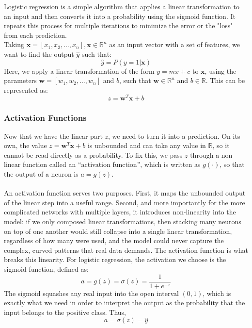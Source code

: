 \documentclass{article}
\begin{document}
Logistic regression is a simple algorithm that applies a linear transformation to an input and then converts it into a probability using the sigmoid function. It repeats this process for multiple iterations to minimize the error or the "loss" from each prediction.
\\
Taking $\mathbf{x} = [x_1, x_2, \dots, x_n], \mathbf{x} \in \mathbb{R}^n$ as an input vector with a set of features, we want to find the output $\hat{y}$ such that:
$$\hat{y} = P(y=1|\mathbf{x})$$
Here, we apply a linear transformation of the form $y=mx+c$ to $\mathbf{x}$, using the parameters $\mathbf{w}=[w_1, w_2, \dots, w_n]$ and $b$, such that $\mathbf{w} \in \mathbb{R}^n$ and $b \in \mathbb{R}$. This can be represented as:
\begin{equation}
    z = \mathbf{w}^T\mathbf{x}+b
\end{equation}
\subsubsection{Activation Functions}
Now that we have the linear part $z$, we need to turn it into a prediction. On its own, the value $z = \mathbf{w}^T\mathbf{x} + b$ is unbounded and can take any value in $\mathbb{R}$, so it cannot be read directly as a probability. To fix this, we pass $z$ through a non-linear function called an ``activation function'', which is written as $g(\cdot)$, so that the output of a neuron is $a = g(z)$.
\\
\\
An activation function serves two purposes. First, it maps the unbounded output of the linear step into a useful range. Second, and more importantly for the more complicated networks with multiple layers, it introduces non-linearity into the model: if we only composed linear transformations, then stacking many neurons on top of one another would still collapse into a single linear transformation, regardless of how many were used, and the model could never capture the complex, curved patterns that real data demands. The activation function is what breaks this linearity.
For logistic regression, the activation we choose is the sigmoid function, defined as:
\begin{equation}
    a = g(z) = \sigma(z) = \frac{1}{1 + e^{-z}}
\end{equation}
The sigmoid squashes any real input into the open interval $(0, 1)$, which is exactly what we need in order to interpret the output as the probability that the input belongs to the positive class. Thus,
$$a = \sigma(z) = \hat{y}$$
\end{document}

